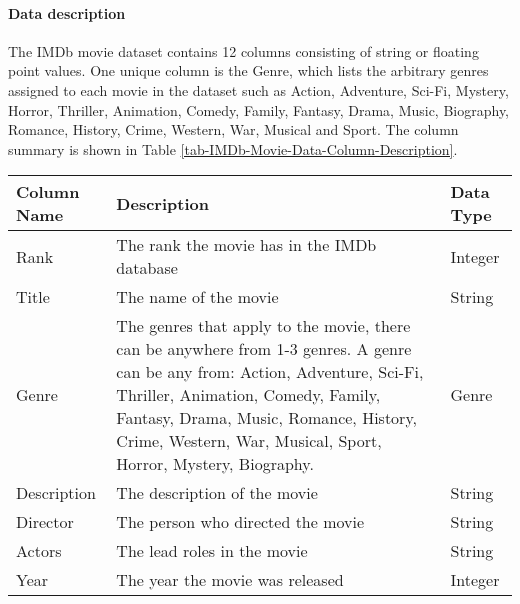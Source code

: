     \paragraph{Data description}
        The IMDb movie dataset contains 12 columns consisting of string or floating
            point values.
        One unique column is the Genre, which lists the arbitrary genres assigned to
            each movie in the dataset such as Action, Adventure, Sci-Fi, Mystery, Horror,
            Thriller, Animation, Comedy, Family, Fantasy, Drama, Music, Biography, Romance,
            History, Crime, Western, War, Musical and Sport.
        The column summary is shown in Table
            \ref{tab-IMDb-Movie-Data-Column-Description}.
        \begin{table}[h]
            \centering
            \begin{tabular}{lp{10cm}l}
                \toprule
                Column Name        & Description                                                                & Data Type \\
                \midrule
                Rank               & The rank the movie has in the IMDb database                                & Integer   \\
                Title              & The name of the movie                                                      & String    \\
                Genre              & The genres that apply to the movie, there can be anywhere from 1-3 genres.
                A genre can be any from: Action, Adventure, Sci-Fi, Thriller, Animation,
                    Comedy, Family, Fantasy, Drama, Music, Romance, History, Crime, Western, War,
                    Musical, Sport, Horror, Mystery, Biography.
                                   & Genre                                                                                  \\
                Description        & The description of the movie                                               & String    \\
                Director           & The person who directed the movie                                          & String    \\
                Actors             & The lead roles in the movie                                                & String    \\
                Year               & The year the movie was released                                            & Integer   \\

\end{tabular}
\end{table}
